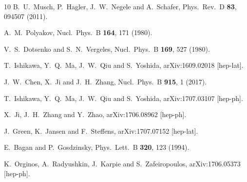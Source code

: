 \begin{thebibliography}{10}
B.~U.~Musch, P.~Hagler, J.~W.~Negele and A.~Schafer,
Phys.\ Rev.\ D {\bf 83}, 094507 (2011).

A.~M.~Polyakov,
Nucl.\ Phys.\ B {\bf 164}, 171 (1980).

V.~S.~Dotsenko and S.~N.~Vergeles,
Nucl.\ Phys.\ B {\bf 169}, 527 (1980).

T.~Ishikawa, Y.~Q.~Ma, J.~W.~Qiu and S.~Yoshida,
arXiv:1609.02018 [hep-lat].

J.~W.~Chen, X.~Ji and J.~H.~Zhang,
Nucl.\ Phys.\ B {\bf 915}, 1 (2017).

T.~Ishikawa, Y.~Q.~Ma, J.~W.~Qiu and S.~Yoshida,
arXiv:1707.03107 [hep-ph].

X.~Ji, J.~H.~Zhang and Y.~Zhao,
arXiv:1706.08962 [hep-ph].

J.~Green, K.~Jansen and F.~Steffens,
arXiv:1707.07152 [hep-lat].

E.~Bagan and P.~Gosdzinsky,
Phys.\ Lett.\ B {\bf 320}, 123 (1994).

K.~Orginos, A.~Radyushkin, J.~Karpie and S.~Zafeiropoulos,
arXiv:1706.05373 [hep-ph].

\end{thebibliography}
